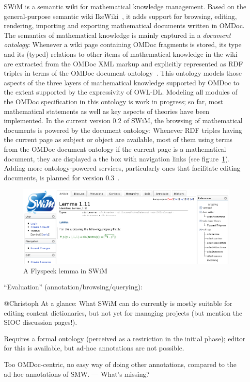 \documentclass{llncs}
\begin{document}
SWiM is a semantic wiki for mathematical knowledge management.  Based on the
general-purpose semantic wiki IkeWiki~\cite{KrSchVr:semwiki-reasoning07}, it adds support
for browsing, editing, rendering, importing and exporting mathematical documents written
in OMDoc.  The semantics of mathematical knowledge is mainly captured in a \emph{document
  ontology}: Whenever a wiki page containing OMDoc fragments is stored, its type and its
(typed) relations to other items of mathematical knowledge in the wiki are extracted from
the OMDoc XML markup and explicitly represented as RDF triples in terms of the OMDoc
document ontology~\cite{OMDocDocOnto:web}.  This ontology models those aspects of the
three layers of mathematical knowledge supported by OMDoc to the extent supported by the
expressivity of OWL-DL.  Modeling all modules of the OMDoc specification in this ontology
is work in progress; so far, most mathematical statements as well as key aspects of
theories have been implemented.  In the current version 0.2 of SWiM, the browsing of
mathematical documents is powered by the document ontology: Whenever RDF triples having
the current page as subject or object are available, most of them using terms from the
OMDoc document ontology if the current page is a mathematical document, they are displayed
a the box with navigation links (see figure~\ref{fig:swim-lemma}).  Adding more
ontology-powered services, particularly ones that facilitate editing documents, is planned
for version 0.3~\cite{swim-roadmap,Lange:SWiMSciColl07}.

\begin{figure}
  \centering
  \includegraphics[width=.7\textwidth]{swim-lemma}
  \caption{A Flyspeck lemma in SWiM}
  \label{fig:swim-lemma}
\end{figure}

``Evaluation'' (annotation/browsing/querying):
\begin{todo}{@Christoph}
At a glance: What SWiM can do currently is mostly suitable for editing content
dictionaries, but not yet for managing projects (but mention the SIOC discussion pages!).

Requires a formal ontology (perceived as a restriction in the initial phase); editor for
this is available, but ad-hoc annotations are not possible.

Too OMDoc-centric, no easy way of doing other annotations, compared to the ad-hoc
annotations of SMW. --- What's missing?
\end{todo}
\end{document}
